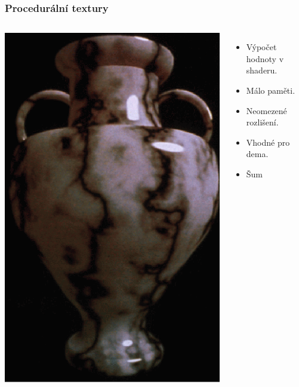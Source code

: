 \begin{frame}
    \frametitle{Procedurální textury}

    \begin{columns}[c]
        \includegraphics[width=\textwidth]{pics/procedural/vase.eps}
        \begin{itemize}
            \item Výpočet hodnoty v shaderu.
            \item Málo paměti.
            \item Neomezené rozlišení.
            \item Vhodné pro dema.
            \item Šum
        \end{itemize}
    \end{columns}
\end{frame}

